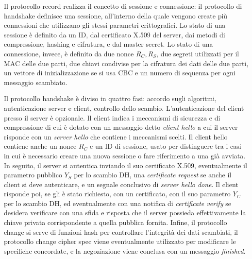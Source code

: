 \documentclass[answers, a4paper, 11pt]{exam}
\begin{document}
\begin{questions}
\begin{parts}
\begin{solution}
Il protocollo record realizza il concetto di sessione e connessione: il protocollo di handshake definisce una sessione, all'interno della quale vengono create più connessioni che utilizzano gli stessi parametri crittografici.
Lo stato di una sessione è definito da un ID, dal certificato X.509 del server, dai metodi di compressione, hashing e cifratura, e dal master secret.
Lo stato di una connessione, invece, è definito da due nonce $R_C, R_S$, due segreti utilizzati per il MAC delle due parti, due chiavi condivise per la cifratura dei dati delle due parti, un vettore di inizializzazione se si usa CBC e un numero di sequenza per ogni  messaggio scambiato.

Il protocollo handshake è diviso in quattro fasi: accordo sugli algoritmi, autenticazione server e client, controllo dello scambio.
L'autenticazione del client presso il server è opzionale. 
Il client indica i meccanismi di sicurezza e di compressione di cui è dotato con un messaggio detto \textit{client hello} a cui il server risponde con un \textit{server hello} che contiene i meccanismi scelti.
Il client hello contiene anche un nonce $R_C$ e un ID di sessione, usato per distinguere tra i casi in cui è necessario creare una nuova sessione o fare riferimento a una già avviata. 
In seguito, il server si autentica inviando il suo certificato X.509, eventualmente il parametro pubblico $Y_S$ per lo scambio DH, una \textit{certificate request} se anche il client si deve autenticare, e un segnale conclusivo di \textit{server hello done}.
Il client risponde poi, se gli è stato richiesto, con un certificato, con il suo parametro $Y_C$ per lo scambio DH, ed eventualmente con una notifica di \textit{certificate verify} se desidera verificare con una sfida e risposta che il server possieda effettivamente la chiave privata corrispondente a quella pubblica fornita. 
Infine, il protocollo change si serve di funzioni hash per controllare l'integrità dei dati scambiati, il protocollo change cipher spec viene eventualmente utilizzato per modificare le specifiche concordate, e la negoziazione viene conclusa con un messaggio \textit{finished}.

\end{solution}

\end{parts}
\end{questions}
\end{document}
